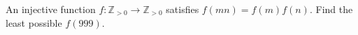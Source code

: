 An injective function $f:\mathbb Z_{>0}\to\mathbb Z_{>0}$ satisfies $f(mn)=f(m)f(n)$. Find the least possible $f(999)$.
